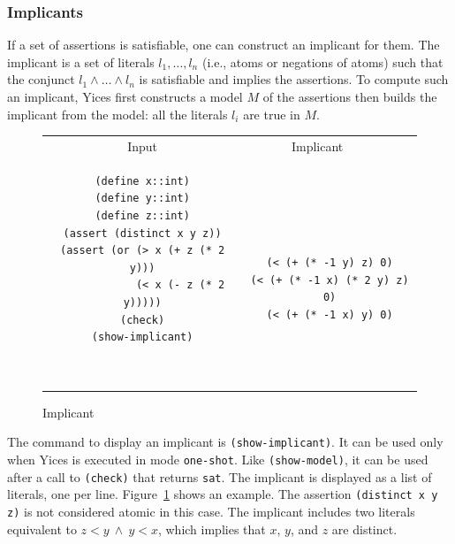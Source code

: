 \documentclass[11pt,twoside,fleqn,openright,titlepage]{cslreport}
\begin{document}
\subsubsection*{Implicants}

If a set of assertions is satisfiable, one can construct an implicant
for them. The implicant is a set of literals $l_1,\ldots,l_n$ (i.e.,
atoms or negations of atoms) such that the conjunct $l_1 \wedge \ldots
\wedge l_n$ is satisfiable and implies the assertions. To compute such
an implicant, Yices first constructs a model $M$ of the assertions then
builds the implicant from the model: all the literals $l_i$ are
true in $M$.

\begin{figure}
\begin{footnotesize}
\begin{center}
\begin{tabular}{c|c}
\multicolumn{1}{c}{Input} & \multicolumn{1}{c}{Implicant~~~~} \\[0.4em]

\begin{minipage}[c]{6.2cm}
\begin{verbatim}
(define x::int)
(define y::int)
(define z::int)
(assert (distinct x y z))
(assert (or (> x (+ z (* 2 y)))
            (< x (- z (* 2 y)))))
(check)
(show-implicant)
\end{verbatim}
\end{minipage}~~
&
~~~\begin{minipage}[c]{6cm}
\begin{verbatim}
(< (+ (* -1 y) z) 0)
(< (+ (* -1 x) (* 2 y) z) 0)
(< (+ (* -1 x) y) 0)
\end{verbatim}
\end{minipage}
\end{tabular}
\end{center}
\end{footnotesize}
\caption{Implicant}
\label{implicant-format}
\end{figure}

\medskip\noindent The command to display an implicant is
\texttt{(show-implicant)}. It can be used only when Yices is executed
in mode \texttt{one-shot}. Like \texttt{(show-model)}, it can be used
after a call to \texttt{(check)} that returns \texttt{sat}. The
implicant is displayed as a list of literals, one per
line. Figure~\ref{implicant-format} shows an example. The assertion
\texttt{(distinct x y z)} is not considered atomic in this case. The
implicant includes two literals equivalent to $z < y\ \wedge\ y < x$,
which implies that $x$, $y$, and $z$ are distinct.
\end{document}
